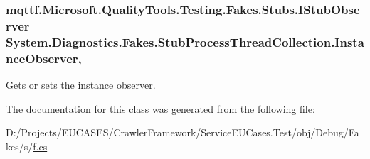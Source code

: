 \hypertarget{class_system_1_1_diagnostics_1_1_fakes_1_1_stub_process_thread_collection_a81d427730021838f3ad63c71237b4507}{
\subsubsection[{Instance\-Observer}]{\setlength{\rightskip}{0pt plus 5cm}mqttf.\-Microsoft.\-Quality\-Tools.\-Testing.\-Fakes.\-Stubs.\-I\-Stub\-Observer System.\-Diagnostics.\-Fakes.\-Stub\-Process\-Thread\-Collection.\-Instance\-Observer\hspace{0.3cm}{\ttfamily [get]}, {\ttfamily [set]}}}\label{class_system_1_1_diagnostics_1_1_fakes_1_1_stub_process_thread_collection_a81d427730021838f3ad63c71237b4507}


Gets or sets the instance observer.



The documentation for this class was generated from the following file\-:\begin{DoxyCompactItemize}
\item 
D\-:/\-Projects/\-E\-U\-C\-A\-S\-E\-S/\-Crawler\-Framework/\-Service\-E\-U\-Cases.\-Test/obj/\-Debug/\-Fakes/s/\hyperlink{s_2f_8cs}{f.\-cs}\end{DoxyCompactItemize}
